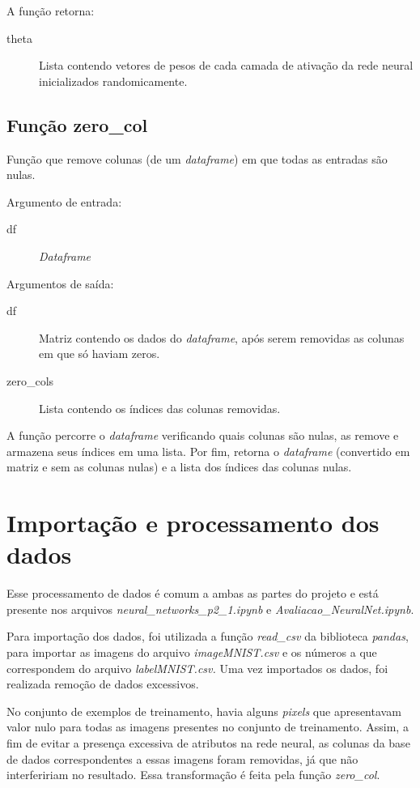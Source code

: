 \documentclass[12pt]{article}
\begin{document}
A função retorna:
\begin{description}
\item[theta] Lista contendo vetores de pesos de cada camada de ativação da rede neural inicializados randomicamente.
\end{description}

\subsection{Função zero\_col}
Função que remove colunas (de um \textit{dataframe}) em que todas as entradas são nulas.

Argumento de entrada:

\begin{description}
\item[df] \textit{Dataframe}
\end{description}

Argumentos de saída:
\begin{description}
\item[df] Matriz contendo os dados do \textit{dataframe}, após serem removidas as colunas em que só haviam zeros.

\item[zero\_cols] Lista contendo os índices das colunas removidas.
\end{description}

A função percorre o \textit{dataframe} verificando quais colunas são nulas, as remove e armazena seus índices em uma lista. Por fim, retorna o \textit{dataframe} (convertido em matriz e sem as colunas nulas) e a lista dos índices das colunas nulas.

\section{Importação e processamento dos dados} \label{dados}
Esse processamento de dados é comum a ambas as partes do projeto e está presente nos arquivos \textit{neural\_networks\_p2\_1.ipynb} e \textit{Avaliacao\_NeuralNet.ipynb}.

Para importação dos dados, foi utilizada a função \textit{read\_csv} da biblioteca \textit{pandas}, para importar as imagens do arquivo \textit{imageMNIST.csv} e os números a que correspondem do arquivo \textit{labelMNIST.csv.} Uma vez importados os dados, foi realizada remoção de dados excessivos.

No conjunto de exemplos de treinamento, havia alguns \textit{pixels} que apresentavam valor nulo para todas as imagens presentes no conjunto de treinamento. Assim, a fim de evitar a presença excessiva de atributos na rede neural, as colunas da base de dados correspondentes a essas imagens foram removidas, já que não interfeririam no resultado. Essa transformação é feita pela função \textit{zero\_col}.
\end{document}
